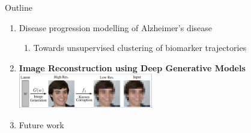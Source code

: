 \documentclass[8pt,xcolor=table]{beamer}
\begin{document}
\begin{frame}{Outline}

\begin{enumerate}
 \item Disease progression modelling of Alzheimer's disease
 \begin{enumerate} 
  \item Towards unsupervised clustering of biomarker trajectories\\
 \end{enumerate}
   
 
  
  \vt

 \item \textbf{Image Reconstruction using Deep Generative Models}\\
 \includegraphics[height=1.5cm, trim=6 6 300 6,clip]{brgm_diagram_small}
\vt
 
  \item Future work\\

\end{enumerate}
\end{frame}



\end{document}

